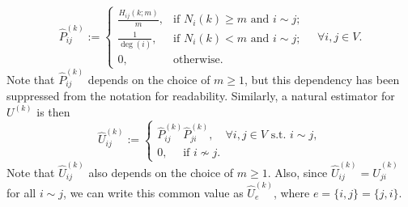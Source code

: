 \documentclass[a4paper, 11pt]{article}
\begin{document}
\begin{equation}
\label{eqn:est-p}
\hat{P}_{ij}^{(k)}:=
\begin{cases}
    \frac{H_{ij}(k; m)}{m}, & \text{if } N_i(k) \geq m\text{ and } i\sim j; \\
    \frac{1}{\deg(i)}, & \text{if } N_i(k) < m\text{ and } i\sim j; \\
    0, & \text{otherwise}.
\end{cases}
\quad\forall i, j\in V.
\end{equation}
Note that $\hat{P}_{ij}^{(k)}$ depends on 
the choice of $m \ge 1$, but this dependency has been 
suppressed from the notation for readability.
Similarly, a natural estimator for $U^{(k)}$ is then
\begin{equation}
\label{eqn:est-uk}
\hat{U}_{ij}^{(k)}:= \begin{cases} \hat{P}_{ij}^{(k)}\hat{P}_{ji}^{(k)},\quad\forall i,j\in V\text{ s.t. }i\sim j,\\
0, \quad \text{ if } i \nsim j.
\end{cases}
\end{equation}
Note that $\hat{U}_{ij}^{(k)}$ also depends on the choice of $m \ge 1$. Also, since $\hat{U}_{ij}^{(k)}
= \hat{U}_{ji}^{(k)}$ for all $i \sim j$, we can 
write this common value as $\hat{U}_e^{(k)}$,
where $e = \{i,j\} = \{j,i\}$. 
\end{document}
